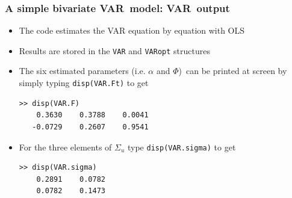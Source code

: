 \begin{xframe}
\frametitle{A simple bivariate VAR\ model: VAR\ output}\medskip

\begin{itemize}
\item The code estimates the VAR equation by equation with OLS \bigskip\ 

\item Results are stored in the \colorbox{script!80}{\small\texttt{VAR}} and %
\colorbox{script!80}{\small\texttt{VARopt}} structures\bigskip

\item The six estimated parameters (i.e. $\alpha $ and $\Phi $)\ can be
printed at screen by simply typing \colorbox{script!80}{\small%
\texttt{disp(VAR.Ft)}} to get \medskip

\begin{minipage}{\textwidth}
\begin{verbatim}
>> disp(VAR.F)
    0.3630    0.3788    0.0041
   -0.0729    0.2607    0.9541
\end{verbatim}
\end{minipage}

\bigskip

\item For the three elements of $\Sigma _{u}$ type \colorbox{script!80}{%
\small \texttt{disp(VAR.sigma)}} to get \medskip

\begin{minipage}{\textwidth}
\begin{verbatim}
>> disp(VAR.sigma)
    0.2891    0.0782
    0.0782    0.1473
\end{verbatim}
\end{minipage}
\end{itemize}
\end{xframe}


